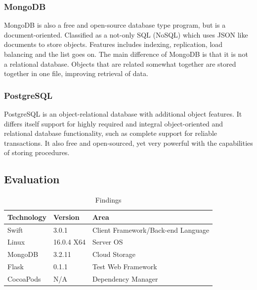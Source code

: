 \subsubsection{MongoDB}
MongoDB \cite{mongoDB} is also a free and open-source database type program, but is a document-oriented. Classified as a not-only SQL (NoSQL) which uses JSON like documents to store objects. Features includes indexing, replication, load balancing and the list goes on. The main difference of MongoDB is that it is not a relational database. Objects that are related somewhat together are stored together in one file, improving retrieval of data.

\subsubsection{PostgreSQL}
PostgreSQL \cite{postgreSQL} is an object-relational database with additional object features. It differs itself support for highly required and integral object-oriented and relational database functionality, such as complete support for reliable transactions. It also free and open-sourced, yet very powerful with the capabilities of storing procedures.

\subsection{Evaluation}

\begin{table}[h]
\centering
\caption{Findings}
\label{my-label}
\begin{tabular}{|l|l|l|}
\hline
\cellcolor{green!20}Technology & \cellcolor{green!20}Version  & \cellcolor{green!20}Area \\ \hline
Swift      & 3.0.1      & Client Framework/Back-end Language \\ \hline
Linux      & 16.0.4 X64 & Server OS                          \\ \hline
MongoDB    & 3.2.11     & Cloud Storage                      \\ \hline
Flask      & 0.1.1      & Test Web Framework                 \\ \hline
CocoaPods  & N/A        & Dependency Manager                 \\ \hline
\end{tabular}
\end{table}

